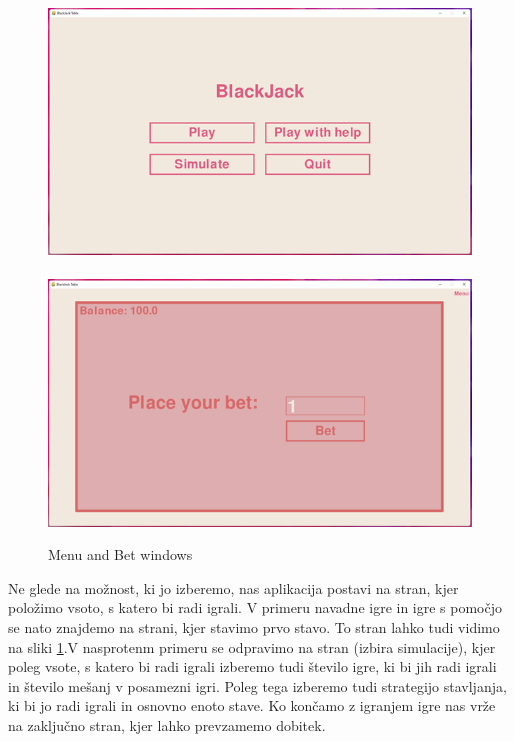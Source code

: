 \documentclass[a4paper, 16pt]{article}
\begin{document}
\begin{figure}[htbp]
\centering
{}
\includegraphics{meni.png}\,%
\includegraphics{bet.png}
\caption{Menu and Bet windows}
\label{fig:menu}
 \end{figure}


Ne glede na možnost, ki jo izberemo, nas aplikacija postavi na stran, kjer položimo vsoto, s katero bi radi igrali. V primeru navadne igre in igre s pomočjo se nato znajdemo na strani, kjer stavimo prvo stavo. To stran lahko tudi vidimo na sliki \ref{fig:menu}.V nasprotenm primeru se odpravimo na stran (izbira simulacije), kjer poleg vsote, s katero bi radi igrali izberemo tudi število igre, ki bi jih radi igrali in število mešanj v posamezni igri. Poleg tega izberemo tudi strategijo stavljanja, ki bi jo radi igrali in osnovno enoto stave.
Ko končamo z igranjem igre nas vrže na zaključno stran, kjer lahko prevzamemo dobitek. \\
\end{document}
